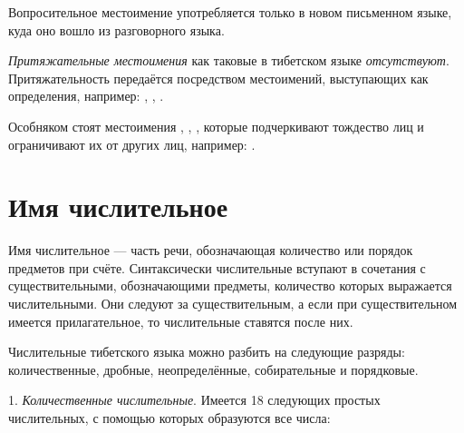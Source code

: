 Вопросительное местоимение  употребляется только в новом письменном языке, куда оно вошло из разговорного языка.

\emph{Притяжательные местоимения} как таковые в тибетском языке \emph{отсутствуют}. Притяжательность передаётся посредством местоимений, выступающих как определения, например:
,
,
.

Особняком стоят местоимения	, , , которые подчеркивают тождество лиц и ограничивают их от других лиц, например: .

\section{Имя числительное}

Имя числительное --- часть речи, обозначающая количество или порядок предметов при счёте. Синтаксически числительные вступают в сочетания с существительными, обозначающими предметы, количество которых выражается числительными. Они следуют за существительным, а если при существительном имеется прилагательное, то числительные ставятся после них.

Числительные тибетского языка можно разбить на следующие разряды: количественные, дробные, неопределённые, собирательные и порядковые.

1. \emph{Количественные числительные}. Имеется 18 следующих простых числительных, с помощью которых образуются все числа:

\begin{multicols}{2}
    \\
    \\
    \\
    \\
    \\
    \\
    \\
    \\
    \\
    \\
    \\
    \\
    \\
    \\
    \\
    \\
    \\
    \\
\end{multicols}


